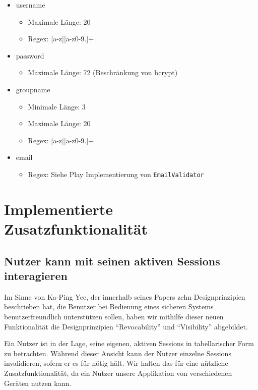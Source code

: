 \documentclass[12pt,DIV14,BCOR10mm,a4paper,parskip=half-,headsepline,headinclude,english,ngerman,bibliography=totocnumbered]{scrreprt}
\begin{document}
\begin{itemize}
	\item username
	 \begin{itemize}
			\item Maximale Länge: 20
			\item Regex: [a-z][a-z0-9.]+
		\end{itemize}


	\item password
	\begin{itemize}
		\item Maximale Länge: 72 (Beschränkung von bcrypt)
	\end{itemize}

	\item groupname
	\begin{itemize}
		\item Minimale Länge: 3
		\item Maximale Länge: 20
		\item Regex: [a-z][a-z0-9.]+

	\end{itemize}


	\item email
	\begin{itemize}
		\item Regex: Siehe Play Implementierung von \texttt{EmailValidator}
	\end{itemize}


\end{itemize}






\chapter{Implementierte Zusatzfunktionalität}

\section{Nutzer kann mit seinen aktiven Sessions interagieren}

Im Sinne von Ka-Ping Yee, der innerhalb seines Papers  \autocite{Yee.UserInteraction} zehn Designprinzipien beschrieben hat, die Benutzer bei Bedienung eines sicheren Systems benutzerfreundlich unterstützen sollen, haben wir mithilfe dieser neuen Funktionalität die Designprinzipien \enquote{Revocability} und \enquote{Visibility} abgebildet. \par
Ein Nutzer ist in der Lage, seine eigenen, aktiven Sessions in tabellarischer Form zu betrachten.
Während dieser Ansicht kann der Nutzer einzelne Sessions invalidieren, sofern er es für nötig hält.
Wir halten das für eine nützliche Zusatzfunktionalität, da ein Nutzer unsere Applikation von verschiedenen Geräten nutzen kann.
\end{document}
